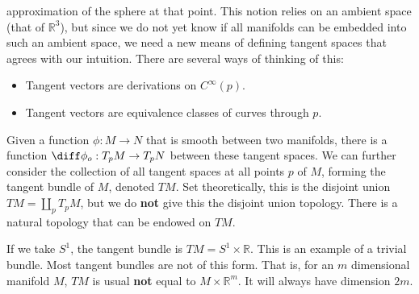 \documentclass{article}                                                        %
\begin{document}
        approximation of the sphere at that point. This notion relies on an
        ambient space (that of $\mathbb{R}^{3}$), but since we do not yet know
        if all manifolds can be embedded into such an ambient space, we need a
        new means of defining tangent spaces that agrees with our intuition.
        There are several ways of thinking of this:
        \begin{itemize}
            \item Tangent vectors are derivations on $C^{\infty}(p)$.
            \item Tangent vectors are equivalence classes of curves through $p$.
        \end{itemize}
        Given a function $\phi:M\rightarrow{N}$ that is smooth between two
        manifolds, there is a function $\diff\phi_{o}:T_{p}M\rightarrow{T}_{p}N$
        between these tangent spaces. We can further consider the collection of
        all tangent spaces at all points $p$ of $M$, forming the tangent bundle
        of $M$, denoted $TM$. Set theoretically, this is the disjoint union
        $TM=\coprod_{p}T_{p}M$, but we do \textbf{not} give this the disjoint
        union topology. There is a natural topology that can be endowed on $TM$.
        \begin{example}
            If we take $S^{1}$, the tangent bundle is
            $TM=S^{1}\times\mathbb{R}$. This is an example of a trivial bundle.
            Most tangent bundles are not of this form. That is, for an $m$
            dimensional manifold $M$, $TM$ is usual \textbf{not} equal to
            $M\times\mathbb{R}^{m}$. It will always have dimension $2m$.
        \end{example}
\end{document}
